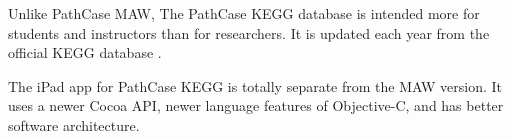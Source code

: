 Unlike PathCase MAW, The PathCase KEGG database is intended more for students
and instructors than for researchers. It is updated each year from the official
KEGG database \cite{pathcase-basic}.

The iPad app for PathCase KEGG is totally separate from the MAW version. It uses
a newer Cocoa API, newer language features of Objective-C, and has better
software architecture.






